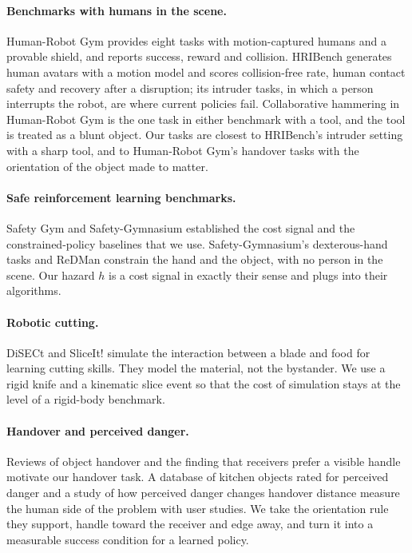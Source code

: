 \documentclass[11pt,letterpaper]{article}
\begin{document}
\paragraph{Benchmarks with humans in the scene.}
Human-Robot Gym \cite{thumm2024humanrobotgym} provides eight tasks with motion-captured humans and a provable shield, and reports success, reward and collision. HRIBench \cite{liu2026hribench} generates human avatars with a motion model and scores collision-free rate, human contact safety and recovery after a disruption; its intruder tasks, in which a person interrupts the robot, are where current policies fail. Collaborative hammering in Human-Robot Gym is the one task in either benchmark with a tool, and the tool is treated as a blunt object. Our tasks are closest to HRIBench's intruder setting with a sharp tool, and to Human-Robot Gym's handover tasks with the orientation of the object made to matter.

\paragraph{Safe reinforcement learning benchmarks.}
Safety Gym \cite{ray2019safetygym} and Safety-Gymnasium \cite{ji2023safetygymnasium} established the cost signal and the constrained-policy baselines \cite{achiam2017cpo,ji2024omnisafe} that we use. Safety-Gymnasium's dexterous-hand tasks and ReDMan \cite{geng2025redman} constrain the hand and the object, with no person in the scene. Our hazard $h$ is a cost signal in exactly their sense and plugs into their algorithms.

\paragraph{Robotic cutting.}
DiSECt \cite{heiden2021disect} and SliceIt! \cite{beltran2024sliceit} simulate the interaction between a blade and food for learning cutting skills. They model the material, not the bystander. We use a rigid knife and a kinematic slice event so that the cost of simulation stays at the level of a rigid-body benchmark.

\paragraph{Handover and perceived danger.}
Reviews of object handover \cite{ortenzi2021handovers} and the finding that receivers prefer a visible handle \cite{ortenzi2022handle} motivate our handover task. A database of kitchen objects rated for perceived danger \cite{leusmann2023database} and a study of how perceived danger changes handover distance \cite{perceiveddanger2025handover} measure the human side of the problem with user studies. We take the orientation rule they support, handle toward the receiver and edge away, and turn it into a measurable success condition for a learned policy.
\end{document}
